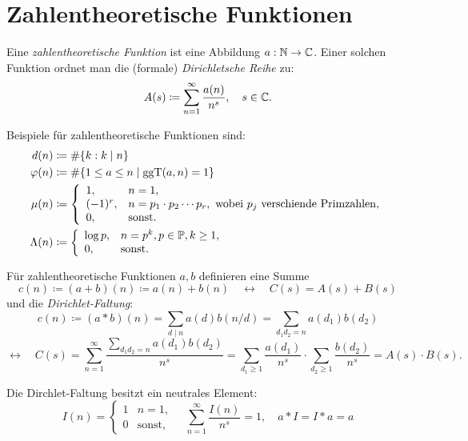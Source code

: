 \chapter{Zahlentheoretische Funktionen}

\begin{definition}
    Eine \emph{zahlentheoretische Funktion} ist eine Abbildung $a : \mathbb{N} \to \mathbb{C}$. Einer solchen Funktion ordnet man die (formale) \emph{Dirichletsche Reihe} zu:
    $$ A(s) \coloneqq \sum_{n=1}^\infty \frac{a(n)}{n^s}, \quad s \in \mathbb{C}. $$
\end{definition}

\begin{example}
    Beispiele für zahlentheoretische Funktionen sind:
    \begin{align*}
        d(n) &\coloneqq \# \{ k : k \mid n \} \\
        \varphi(n) &\coloneqq \# \{ 1 \leq a \leq n \mid \operatorname*{ggT}(a, n) = 1 \} \\
        \mu(n) &\coloneqq \left\{ \begin{array}{ll}
            1, & n = 1, \\
            (-1)^r, & n = p_1 \cdot p_2 \cdots p_r, \textrm{ wobei $p_j$ verschiende Primzahlen}, \\
            0, & \textrm{sonst}.
        \end{array} \right. \\
        \Lambda(n) &\coloneqq \left\{ \begin{array}{ll}
            \log p, & n = p^k, p \in \mathbb{P}, k \geq 1, \\
            0, & \textrm{sonst}.
        \end{array} \right.
    \end{align*}
\end{example}

\begin{definition}
    Für zahlentheoretische Funktionen $a, b$ definieren eine Summe
    $$ c(n) \coloneqq (a+b)(n) \coloneqq a(n) + b(n) \quad \leftrightarrow \quad C(s) = A(s) + B(s) $$
    und die \emph{Dirichlet-Faltung}:
    $$ c(n) \coloneqq (a \ast b)(n) = \sum_{d \mid n} a(d) b(n/d) = \sum_{d_1 d_2 = n} a(d_1) b(d_2) $$
    $$ \leftrightarrow \quad C(s) = \sum_{n=1}^\infty \frac{\sum_{d_1 d_2 = n} a(d_1) b(d_2)}{n^s} = \sum_{d_1 \geq 1} \frac{a(d_1)}{n^s} \cdot \sum_{d_2 \geq 1} \frac{b(d_2)}{n^s} = A(s) \cdot B(s). $$
\end{definition}

\begin{example}
    Die Dirchlet-Faltung besitzt ein neutrales Element:
    $$ I(n) = \left\{ \begin{array}{ll}
        1 & n = 1, \\
        0 & \textrm{sonst},
    \end{array} \right.
    \quad \sum_{n=1}^\infty \frac{I(n)}{n^s} = 1,
    \quad a \ast I = I \ast a = a $$
\end{example}

